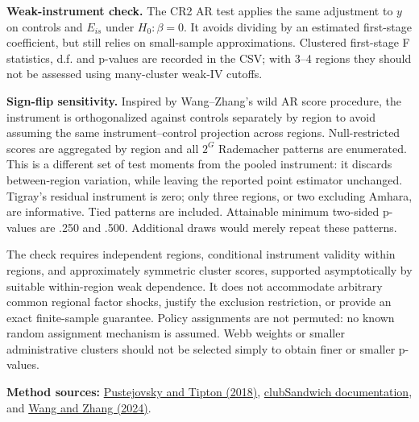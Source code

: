 \textbf{Weak-instrument check.} The CR2 AR test applies the same adjustment to
$y$ on controls and $E_{is}$ under $H_0:\beta=0$. It avoids dividing by an estimated
first-stage coefficient, but still relies on small-sample approximations.
Clustered first-stage F statistics, d.f. and p-values are recorded in the CSV;
with 3--4 regions they should not be assessed using many-cluster weak-IV cutoffs.

\textbf{Sign-flip sensitivity.} Inspired by Wang--Zhang's wild AR score procedure,
the instrument is orthogonalized against controls separately by region to avoid
assuming the same instrument--control projection across regions. Null-restricted
scores are aggregated by region and all $2^G$ Rademacher patterns are enumerated.
This is a different set of test moments from the pooled instrument: it discards
between-region variation, while leaving the reported point estimator unchanged.
Tigray's residual instrument is zero; only three regions, or two excluding Amhara,
are informative. Tied patterns are included. Attainable minimum two-sided
p-values are .250 and .500. Additional draws would merely repeat these patterns.

The check requires independent regions, conditional instrument validity within
regions, and approximately symmetric cluster scores, supported asymptotically
by suitable within-region weak dependence. It does not accommodate arbitrary
common regional factor shocks, justify the exclusion restriction, or provide an
exact finite-sample guarantee. Policy assignments are not permuted: no known
random assignment mechanism is assumed. Webb weights or smaller administrative
clusters should not be selected simply to obtain finer or smaller p-values.

\textbf{Method sources:}
\href{https://doi.org/10.1080/07350015.2016.1247004}{Pustejovsky and Tipton (2018)},
\href{https://jepusto.github.io/clubSandwich/}{clubSandwich documentation}, and
\href{https://doi.org/10.1016/j.jeconom.2024.105727}{Wang and Zhang (2024)}.
